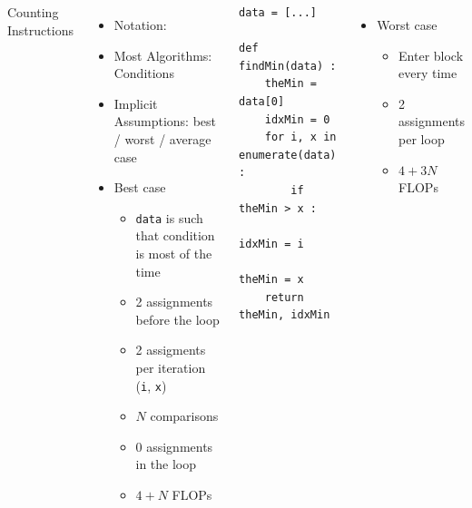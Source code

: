 \begin{frame}[fragile]
%
\begin{columns}[T]
\begin{Large}
	{Counting Instructions}
	\vspace{6pt}
\end{Large}
%
\begin{itemize}
\item Notation: 
\item Most Algorithms: Conditions
\item Implicit Assumptions: best / worst / average case
\item Best case
	\begin{itemize}
	\item \texttt{data} is such that  condition is  most of the time
	\item 2 assignments before the loop
	\item 2 assigments per iteration (\texttt{i}, \texttt{x})
	\item $N$ comparisons
	\item 0 assignments in the loop
	\item[\Thus] $4 + N$ FLOPs
	\end{itemize}
\end{itemize}
%
\begin{codebox}
\begin{verbatim}
data = [...]

def findMin(data) :
    theMin = data[0]
    idxMin = 0
    for i, x in enumerate(data) :
        if theMin > x :
            idxMin = i
            theMin = x
    return theMin, idxMin
\end{verbatim}
\end{codebox}
%
\begin{itemize}
\item Worst case
	\begin{itemize}
	\item Enter  block every time
	\item 2 assignments per loop
	\item[\Thus] $4 + 3N$ FLOPs
	\end{itemize}
\end{itemize}
\end{columns}
%
\end{frame}


